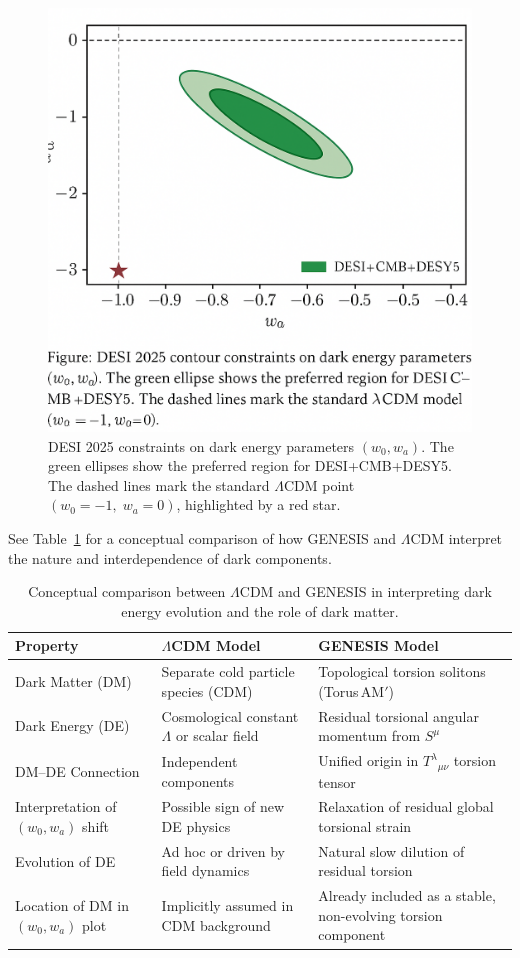 \documentclass{article}
\begin{document}
\begin{figure}[h!]
  \centering
  \includegraphics[width=0.65\linewidth]{desi_contour_clean.png}
  \caption{DESI 2025 constraints on dark energy parameters $(w_0, w_a)$. The green ellipses show the preferred region for DESI+CMB+DESY5. The dashed lines mark the standard $\Lambda$CDM point $(w_0 = -1,\;w_a = 0)$, highlighted by a red star.}
  \label{fig:desi-contour}
\end{figure}

See Table~\ref{tab:LCDM-vs-GENESIS} for a conceptual comparison of how GENESIS and $\Lambda$CDM interpret the nature and interdependence of dark components.

\begin{table}[h!]
\centering
\renewcommand{\arraystretch}{1.3}
\begin{tabular}{|p{4.5cm}|p{5.5cm}|p{5.5cm}|}
\hline
\textbf{Property} & \textbf{\(\Lambda\)CDM Model} & \textbf{GENESIS Model} \\
\hline
Dark Matter (DM) &
Separate cold particle species (CDM) &
Topological torsion solitons (Torus AM$'$) \\
\hline
Dark Energy (DE) &
Cosmological constant $\Lambda$ or scalar field &
Residual torsional angular momentum from $S^\mu$ \\
\hline
DM–DE Connection &
Independent components &
Unified origin in $T^\lambda{}_{\mu\nu}$ torsion tensor \\
\hline
Interpretation of $(w_0, w_a)$ shift &
Possible sign of new DE physics &
Relaxation of residual global torsional strain \\
\hline
Evolution of DE &
Ad hoc or driven by field dynamics &
Natural slow dilution of residual torsion \\
\hline
Location of DM in $(w_0,w_a)$ plot &
Implicitly assumed in CDM background &
Already included as a stable, non-evolving torsion component \\
\hline
\end{tabular}
\caption{Conceptual comparison between $\Lambda$CDM and GENESIS in interpreting dark energy evolution and the role of dark matter.}
\label{tab:LCDM-vs-GENESIS}
\end{table}
\end{document}
